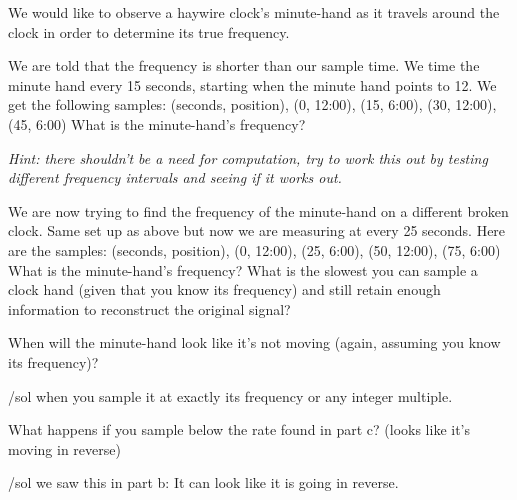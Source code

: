 


We would like to observe a haywire clock’s minute-hand as it travels around the clock in order to determine its true frequency.


\begin{enumerate}
\qitem We are told that the frequency is shorter than our sample time. We time the minute hand every 15 seconds, starting when the minute hand points to 12. We get the following samples:
(seconds, position), (0, 12:00), (15, 6:00), (30, 12:00), (45, 6:00) 
What is the minute-hand’s frequency?

\textit{Hint: there shouldn’t be a need for computation, try to work this out by testing different frequency intervals and seeing if it works out.}


\qitem We are now trying to find the frequency of the minute-hand on a different broken clock. Same set up as above but now we are measuring at every 25 seconds. Here are the samples:
(seconds, position), (0, 12:00), (25, 6:00), (50, 12:00), (75, 6:00)
What is the minute-hand’s frequency?
\qitem What is the slowest you can sample a clock hand (given that you know its frequency) and still retain enough information to reconstruct the original signal?


\qitem When will the minute-hand look like it’s not moving (again, assuming you know its frequency)?

/sol{ when you sample it at exactly its frequency or any integer multiple.
}

\qitem What happens if you sample below the rate found in part c? (looks like it’s moving in reverse)

/sol{ we saw this in part b: It can look like it is going in reverse.
}

\end{enumerate}
